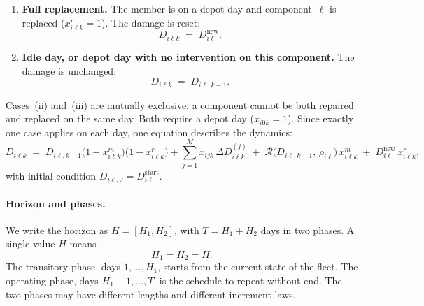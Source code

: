 \documentclass[11pt,a4paper]{article}
\theoremstyle{plain}
\theoremstyle{definition}
\theoremstyle{remark}
\begin{document}
\begin{enumerate}[label=(\roman*)]
  \item \textbf{Full replacement.} The member is on a depot day and component~$\ell$ is replaced ($x^r_{i\ell k}=1$).
    The damage is reset:
    \begin{equation}\label{eq:dyn_replace}
      D_{i\ell k} \;=\; D^{\mathrm{new}}_{i\ell}.
    \end{equation}

  \item \textbf{Idle day, or depot day with no intervention on this component.}
    The damage is unchanged:
    \begin{equation}\label{eq:dyn_idle}
      D_{i\ell k} \;=\; D_{i\ell,k-1}.
    \end{equation}
\end{enumerate}

Cases~(ii) and~(iii) are mutually exclusive: a component cannot be both repaired and replaced on the same day.
Both require a depot day ($x_{i0k}=1$).
Since exactly one case applies on each day, one equation describes the dynamics:
\begin{equation}\label{eq:dyn_full}
  D_{i\ell k} \;=\;
    D_{i\ell,k-1}\bigl(1 - x^m_{i\ell k}\bigr)\bigl(1 - x^r_{i\ell k}\bigr) + \sum_{j=1}^{M} x_{ijk}\,\Delta D_{i\ell k}^{(j)}
    \;+\; \mathcal{R}\!\bigl(D_{i\ell,k-1},\,\rho_{i\ell}\bigr)\,x^m_{i\ell k}
    \;+\; D^{\mathrm{new}}_{i\ell}\,x^r_{i\ell k},
\end{equation}
with initial condition $D_{i\ell,0} = D^{\mathrm{start}}_{i\ell}$.

\paragraph{Horizon and phases.}
We write the horizon as $H = [H_1, H_2]$, with $T = H_1 + H_2$ days in two phases.
A single value $H$ means
\begin{equation}
  H_1 = H_2 = H.
\end{equation}
The transitory phase, days $1,\ldots,H_1$, starts from the current state of the fleet.
The operating phase, days $H_1+1,\ldots,T$, is the schedule to repeat without end.
The two phases may have different lengths and different increment laws.
\end{document}
